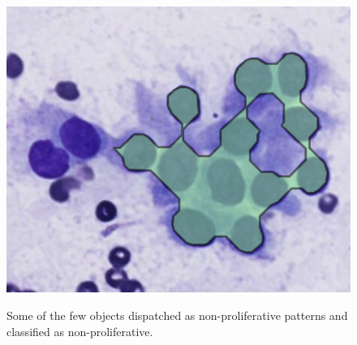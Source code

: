 \begin{figure}
{		\includegraphics[scale=0.3]{image/success_norm_pattern_5_pat.png}
	}
	
	\caption{Some of the few objects dispatched as non-proliferative patterns and classified as non-proliferative.}
	\label{fig:pattern_ex_non_prolif}
\end{figure}

